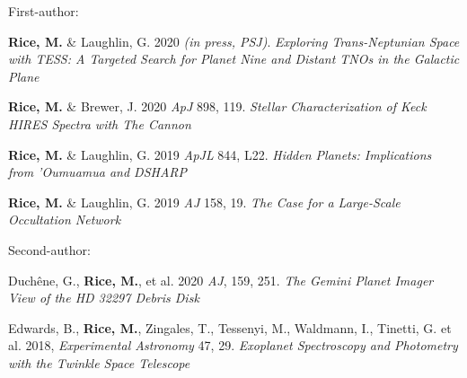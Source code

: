 \documentclass[margin]{res}
\begin{document}
\begin{resume}
First-author:
\begin{etaremune}
\item \textbf{Rice, M.} \& Laughlin, G. 2020 \textit{(in press, PSJ)}. \textit{Exploring Trans-Neptunian Space with TESS: A Targeted Search for Planet Nine and Distant TNOs in the Galactic Plane}
\item \textbf{Rice, M.} \& Brewer, J. 2020 \textit{ApJ} 898, 119. \textit{Stellar Characterization of Keck HIRES Spectra with The Cannon}
\item \textbf{Rice, M.} \& Laughlin, G. 2019 \textit{ApJL} 844, L22. \textit{Hidden Planets: Implications from 'Oumuamua and DSHARP}
\item \textbf{Rice, M.} \& Laughlin, G. 2019 \textit{AJ} 158, 19. \textit{The Case for a Large-Scale Occultation Network}
\end{etaremune}

Second-author:
\begin{etaremune}
\item  Duch\^{e}ne, G., \textbf{Rice, M.}, et al. 2020 \textit{AJ}, 159, 251.  \textit{The Gemini Planet Imager View of the HD 32297 Debris Disk}
\item Edwards, B., \textbf{Rice, M.}, Zingales, T., Tessenyi, M., Waldmann, I., Tinetti, G. et al. 2018, \textit{Experimental Astronomy} 47, 29. \textit{Exoplanet Spectroscopy and Photometry with the Twinkle Space Telescope}
\end{etaremune}


\end{resume}
\end{document}
